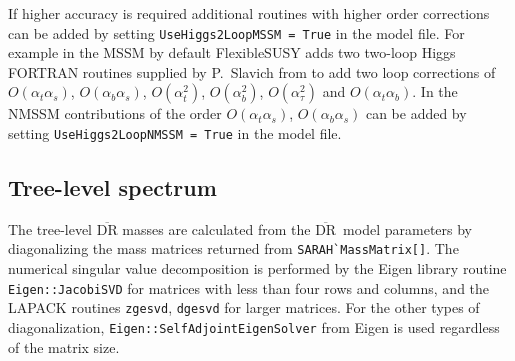 \documentclass[final,3p,11pt,pdflatex]{elsarticle}
\makeatletter
\newcommand{\fs}{FlexibleSUSY\@\xspace}
\newcommand{\code}[1]{\lstinline|#1|}  %
\newcommand{\textoverline}[1]{$\overline{\mbox{#1}}$}
\newcommand{\DRbar}{\textoverline{DR}\xspace}
\def\at{\alpha_t}
\def\ab{\alpha_b}
\def\as{\alpha_s}
\def\atau{\alpha_{\tau}}
\def\oatab{O(\at\ab)}
\def\oatas{O(\at\as)}
\def\oabas{O(\ab\as)}
\def\oatq{O(\at^2)}
\def\oabq{O(\ab^2)}
\def\oatauq{O(\atau^2)}
\makeatother
\begin{document}
If higher accuracy is required additional routines with higher order
corrections can be added by setting \code{UseHiggs2LoopMSSM = True}
in the model file.  For example in the MSSM by default \fs adds two
two-loop Higgs FORTRAN routines supplied by P.~Slavich from
\cite{Degrassi:2001yf,Brignole:2001jy,Dedes:2002dy,Brignole:2002bz,Dedes:2003km}
to add two loop corrections of $\oatas$, $\oabas$, $\oatq$,
$\oabq$, $\oatauq$ and $\oatab$.  In the NMSSM
contributions of the order $\oatas$, $\oabas$ \cite{Degrassi:2009yq}
can be added by setting \code{UseHiggs2LoopNMSSM = True} in the model
file.

\subsection{Tree-level spectrum}
\label{sec:TreeLevelSpectrum}
The tree-level \DRbar masses are calculated from the \DRbar\ model
parameters by diagonalizing the mass matrices returned from
\code{SARAH`MassMatrix[]}.  The numerical singular value decomposition
is performed by the Eigen library routine \code{Eigen::JacobiSVD} for
matrices with less than four rows and columns, and the LAPACK routines
\code{zgesvd}, \code{dgesvd} for larger matrices.  For the other types
of diagonalization, \code{Eigen::SelfAdjointEigenSolver} from Eigen is
used regardless of the matrix size.
\end{document}
